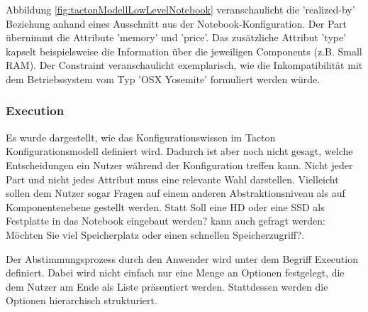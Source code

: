 \documentclass[11pt, a4paper, titlepage, listof=totoc, bibliography=totoc, index=totoc, twoside, openright, headings=normal]{scrreprt}
\begin{document}
Abbildung \ref{fig:tactonModellLowLevelNotebook} veranschaulicht die 'realized-by' Beziehung anhand eines Ausschnitt aus der Notebook-Konfiguration.  Der Part übernimmt die Attribute 'memory' und 'price'. Das zusätzliche Attribut 'type' kapselt beispielsweise die Information über die jeweiligen Components (z.B. Small RAM). Der Constraint veranschaulicht exemplarisch, wie die Inkompatibilität mit dem Betriebssystem vom Typ 'OSX Yosemite' formuliert werden würde.

\subsubsection{Execution}
\label{subsubsection:Execution}
Es wurde dargestellt, wie das Konfigurationswissen im Tacton Konfigurationsmodell definiert wird. Dadurch ist aber noch nicht gesagt, welche Entscheidungen ein Nutzer während der Konfiguration treffen kann. Nicht jeder Part und nicht jedes Attribut muss eine relevante Wahl darstellen. Vielleicht sollen dem Nutzer sogar Fragen auf einem anderen Abstraktionsniveau als auf Komponentenebene gestellt werden. Statt \glqq Soll eine HD oder eine SSD als Festplatte in das Notebook eingebaut werden?\grqq{} kann auch gefragt werden: \glqq Möchten Sie viel Speicherplatz oder einen schnellen Speicherzugriff?\grqq.

Der Abstimmungsprozess durch den Anwender wird unter dem Begriff \glqq Execution\grqq{} definiert. Dabei wird nicht einfach nur eine Menge an Optionen festgelegt, die dem Nutzer am Ende als Liste präsentiert werden. Stattdessen werden die Optionen hierarchisch strukturiert.
\end{document}
